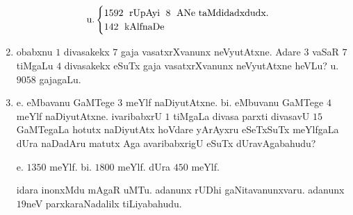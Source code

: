 \begin{enumerate}[\rm(1)]
\begin{equation*}
\text{u.}\\
\begin{cases}
\text{$1592$\; rUpAyi\; $8$\; ANe taMdidadxdudx.}\\
\text{$142$\; kAlfnaDe}
\end{cases}
\end{equation*}


\item obabxnu $1$ divasakekx $7$ gaja vasatxrXvanunx neVyutAtxne. Adare $3$ vaSaR $7$ tiMgaLu $4$ divasakekx eSuTx gaja vasatxrXvanunx neVyutAtxne heVLu?
\hfill u. $9058$ gajagaLu.

\item e. eMbavanu GaMTege $3$ meYlf naDiyutAtxne. bi. eMbuvanu GaMTege $4$ meYlf naDiyutAtxne. ivaribabxrU $1$ tiMgaLa divasa parxti divasavU $15$ GaMTegaLa hotutx naDiyutAtx hoVdare yArAyxru eSeTxSuTx meYlfgaLa dUra naDadAru matutx Aga avaribabxrigU eSuTx dUravAgabahudu?

 e. $1350$ meYlf. bi. $1800$ meYlf. dUra $450$ meYlf.

idara inonxMdu mAgaR uMTu. adanunx rUDhi gaNitavanunxvaru. adanunx $19$neV parxkaraNadalilx tiLiyabahudu.
\end{enumerate}
